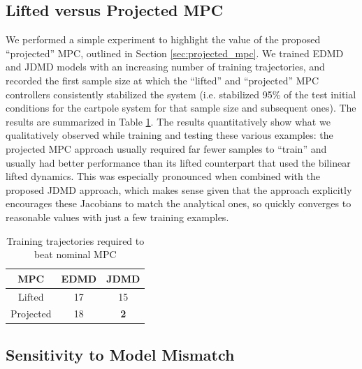 \documentclass{article}
\begin{document}
\subsection{Lifted versus Projected MPC}

We performed a simple experiment to highlight the value of the proposed ``projected'' MPC,
outlined in Section \ref{sec:projected_mpc}. We trained EDMD and JDMD models with an
increasing number of training trajectories, and recorded the first sample size at which the
``lifted'' and ``projected'' MPC controllers consistently stabilized the system (i.e.
stabilized 95\% of the test initial conditions for the cartpole system for that sample size
and subsequent ones).  The results are summarized in Table \ref{tab:mpc_comp}. The results
quantitatively show what we qualitatively observed while training and testing these various
examples: the projected MPC approach usually required far fewer samples to ``train'' and
usually had better performance than its lifted counterpart that used the bilinear
lifted dynamics. This was especially pronounced when combined with the proposed JDMD
approach, which makes sense given that the approach explicitly encourages these Jacobians to
match the analytical ones, so quickly converges to reasonable values with just a few training
examples.

\begin{table}
  \vspace{-2\baselineskip}
  \begin{tabular}{ccc}\\
    \toprule  
    MPC       & {\color{orange} \textbf{EDMD}} & {\textbf{\color{cyan} JDMD}} \\
    \midrule
    Lifted    & 17   &          15 \\
    Projected & 18   &  \textbf{2} \\
    \bottomrule
  \end{tabular}
  \caption{Training trajectories required to beat nominal MPC}
  \vspace{-1\baselineskip}
  \label{tab:mpc_comp}
\end{table} 

\subsection{Sensitivity to Model Mismatch}
\end{document}
